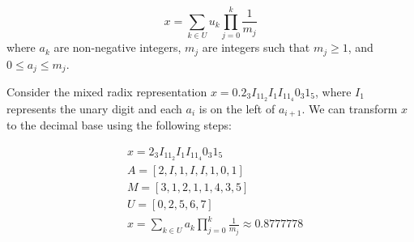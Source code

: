 \begin{equation}
    \label{eq:unary_mixed_radix}
	x = \sum_{k \in U} u_{k} \prod_{j=0}^{k} \frac{1}{m_j}
\end{equation}
where $a_k$ are non-negative integers, $m_j$ are integers such that $m_j \geq 1$, and $0 \leq a_j \leq m_j$.

Consider the mixed radix representation $x=0.2_{3}I_11_{2}I_1I_11_{4}0_{3}1_{5}$, where $I_1$ represents the unary digit and each $a_{i}$ is on the left of $a_{i+1}$. We can transform
$x$ to the decimal base using the following steps:

\begin{align}
    & x=2_{3}I_11_{2}I_1I_11_{4}0_{3}1_{5}\\
    & A=[2,I,1,I,I,1,0,1]\\
    & M=[3,1,2,1,1,4,3,5]\\
    & U=[0,2,5,6,7]\\
    & x = \sum_{k \in U} a_{k} \prod_{j=0}^{k} \frac{1}{m_j} \approx 0.8777778
\end{align}
